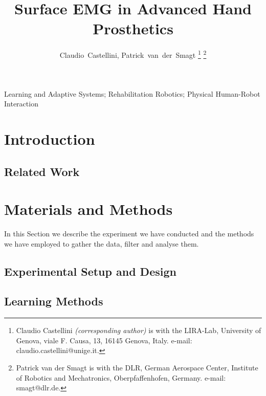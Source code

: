 \documentclass[journal]{IEEEtran}
\begin{document}
\title{Surface EMG in Advanced Hand Prosthetics}

\author{Claudio~Castellini, Patrick~van~der~Smagt
\thanks{Claudio Castellini \emph{(corresponding author)}
  is with the LIRA-Lab, University of Genova,
  viale F. Causa, 13, 16145 Genova, Italy.
  e-mail: claudio.castellini@unige.it.}%
\thanks{Patrick van der Smagt is with the DLR, German Aerospace Center,
  Institute of Robotics and Mechatronics, Oberpfaffenhofen, Germany.
  e-mail: smagt@dlr.de.}%
}

\maketitle

\begin{abstract}
  
\end{abstract}

\begin{IEEEkeywords}
Learning and Adaptive Systems; Rehabilitation Robotics; Physical
Human-Robot Interaction
\end{IEEEkeywords}

\IEEEpeerreviewmaketitle

\section{Introduction}
\label{sec:introduction}


\subsection{Related Work}
\label{subsec:relatedwork}


\section{Materials and Methods}
\label{sec:m&ms}

In this Section we describe the experiment we have conducted and the
methods we have employed to gather the data, filter and analyse them.

\subsection{Experimental Setup and Design}
\label{subsec:setup}


\subsection{Learning Methods}
\label{subsec:analysis}

\end{document}
